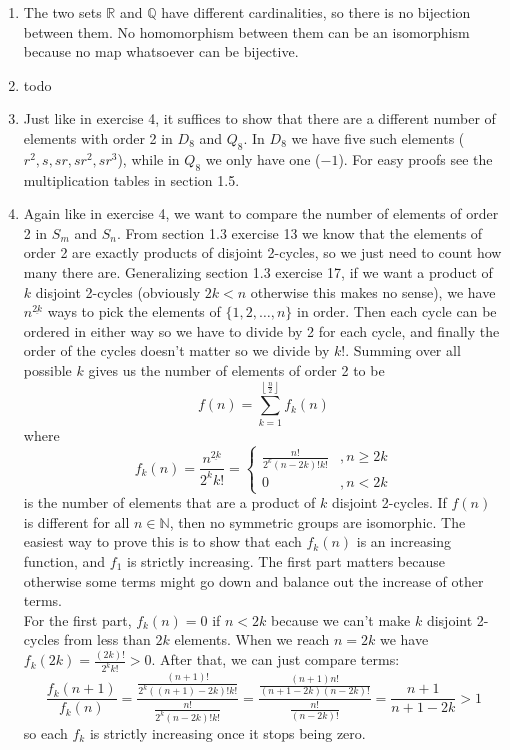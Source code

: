\documentclass[]{article}
\newcommand{\bbq}{\mathbb{Q}}
\newcommand{\bbr}{\mathbb{R}}
\newcommand{\bbn}{\mathbb{N}}
\begin{document}
\begin{enumerate}
\item The two sets $\bbr$ and $\bbq$ have different cardinalities, so there is no bijection between them. No homomorphism between them can be an isomorphism because no map whatsoever can be bijective.


\item {\color{red} todo}


\item Just like in exercise 4, it suffices to show that there are a different number of elements with order 2 in $D_8$ and $Q_8$. In $D_8$ we have five such elements ($r^2, s, sr, sr^2, sr^3$), while in $Q_8$ we only have one ($-1$). For easy proofs see the multiplication tables in section 1.5.


\item Again like in exercise 4, we want to compare the number of elements of order 2 in $S_m$ and $S_n$. From section 1.3 exercise 13 we know that the elements of order 2 are exactly products of disjoint 2-cycles, so we just need to count how many there are. Generalizing section 1.3 exercise 17, if we want a product of $k$ disjoint 2-cycles (obviously $2k < n$ otherwise this makes no sense), we have $n^{\underline{2k}}$ ways to pick the elements of $\{1, 2, \ldots, n\}$ in order. Then each cycle can be ordered in either way so we have to divide by 2 for each cycle, and finally the order of the cycles doesn't matter so we divide by $k!$. Summing over all possible $k$ gives us the number of elements of order 2 to be
\begin{equation}
f(n) = \sum_{k=1}^{\left\lfloor\frac{n}{2}\right\rfloor} f_k(n)
\end{equation}
where
\begin{equation}
f_k(n) = \frac{n^{\underline{2k}}}{2^k k!} = \begin{cases}
\frac{n!}{2^k (n-2k)!k!} &, n\geq 2k\\
0 &, n<2k
\end{cases} \label{eq:1.4.8}
\end{equation}
is the number of elements that are a product of $k$ disjoint 2-cycles. If $f(n)$ is different for all $n \in \bbn$, then no symmetric groups are isomorphic. The easiest way to prove this is to show that each $f_k(n)$ is an increasing function, and $f_1$ is strictly increasing. The first part matters because otherwise some terms might go down and balance out the increase of other terms. \\

For the first part, $f_k(n) = 0$ if $n<2k$ because we can't make $k$ disjoint 2-cycles from less than $2k$ elements. When we reach $n=2k$ we have $f_k(2k) = \frac{(2k)!}{2^k k!} > 0$. After that, we can just compare terms:
\begin{equation}
\frac{f_k(n+1)}{f_k(n)} = \frac{\frac{(n+1)!}{2^k ((n+1)-2k)!k!}}{\frac{n!}{2^k (n-2k)!k!}} = \frac{\frac{(n+1)n!}{ (n+1-2k)(n-2k)!}}{\frac{n!}{(n-2k)!}} = \frac{n+1}{n+1-2k} > 1
\end{equation}
so each $f_k$ is strictly increasing once it stops being zero. \\


\end{enumerate}
\end{document}
